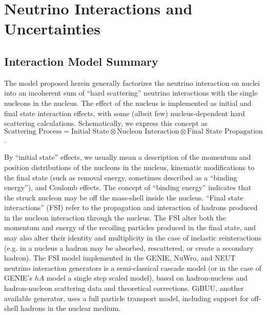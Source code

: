 \section{Neutrino Interactions and Uncertainties}\label{sec:nu-osc-11} \label{sec:physics-lbnosc-nuint-app}


\subsection{Interaction Model Summary}

The model proposed herein generally factorizes the neutrino
interaction on nuclei into an incoherent sum of ``hard scattering'' neutrino interactions with the single nucleons in the nucleus. The effect of the nucleus is implemented as
initial and final state interaction effects, with some (albeit few) nucleus-dependent hard scattering calculations. Schematically, we express this concept as $\text{Scattering Process} = \text{Initial State} \otimes \text{Nucleon Interaction} \otimes \text{Final State Propagation}$.


By ``initial state'' effects, we usually mean a description of the momentum and position distributions of the nucleons in the nucleus, kinematic modifications to the final state (such as removal energy, sometimes described as a ``binding energy''), and Coulomb effects.   The concept of ``binding energy'' indicates that the struck nucleon may be off the mass-shell inside the nucleus.
``Final state interactions'' (FSI) refer to the propagation and interaction of hadrons produced in the nucleon interaction through the nucleus. The FSI alter both the momentum and energy of the recoiling particles produced in the final state, and may also alter their identity and multiplicity in the case of inelastic reinteractions (e.g. in a nucleus a hadron may be absorbed, rescattered, or create a secondary hadron).  The FSI model implemented in the GENIE, NuWro, and NEUT neutrino interaction generators is a semi-classical cascade model (or in the case of GENIE's $hA$ model a single step scaled model), based on hadron-nucleus and hadron-nucleon scattering data and theoretical corrections.  GiBUU, another available generator, uses a full particle transport model, including support for off-shell hadrons in the nuclear medium.

